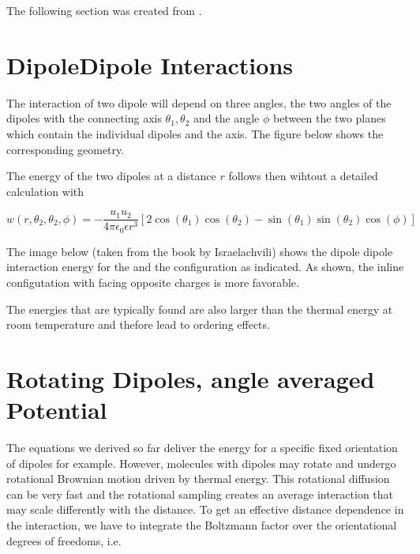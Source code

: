 \documentclass[letterpaper,10pt,english]{sphinxmanual}
\let\sphinxpxdimen\pdfpxdimen\else\newdimen\sphinxpxdimen
\begin{document}
\sphinxAtStartPar
The following section was created from .


\chapter{Dipole\sphinxhyphen{}Dipole Interactions}
\label{\detokenize{notebooks/L8/1_Forces_and_Interactions:Dipole-Dipole-Interactions}}\label{\detokenize{notebooks/L8/1_Forces_and_Interactions::doc}}
\sphinxAtStartPar
The interaction of two dipole will depend on three angles, the two angles of the dipoles with the connecting axis \(\theta_1, \theta_2\) and the angle \(\phi\) between the two planes which contain the individual dipoles and the axis. The figure below shows the corresponding geometry.

\noindent\sphinxincludegraphics[width=300\sphinxpxdimen,height=132\sphinxpxdimen]{{dipole_dipole}.png}

\sphinxAtStartPar
The energy of the two dipoles at a distance \(r\) follows then wihtout a detailed calculation with

\sphinxAtStartPar
\begin{equation}
w(r,\theta_2,\theta_2,\phi)=-\frac{u_1 u_2}{4\pi \epsilon_0 \epsilon r^3}\left [ 2\cos(\theta_1) \cos(\theta_2)-\sin(\theta_1)\sin(\theta_2)\cos(\phi)\right ]
\end{equation}

\sphinxAtStartPar
The image below (taken from the book by Israelachvili) shows the dipole dipole interaction energy for the  and the  configuration as indicated. As shown, the in\sphinxhyphen{}line configutation with facing opposite charges is more favorable.

\noindent\sphinxincludegraphics[width=300\sphinxpxdimen,height=225\sphinxpxdimen]{{dipole_energy}.png}

\sphinxAtStartPar
The energies that are typically found are also larger than the thermal energy at room temperature and thefore lead to ordering effects.


\chapter{Rotating Dipoles, angle averaged Potential}
\label{\detokenize{notebooks/L8/1_Forces_and_Interactions:Rotating-Dipoles,-angle-averaged-Potential}}
\sphinxAtStartPar
The equations we derived so far deliver the energy for a specific fixed orientation of dipoles for example. However, molecules with dipoles may rotate and undergo rotational Brownian motion driven by thermal energy. This rotational diffusion can be very fast and the rotational sampling creates an average interaction that may scale differently with the distance. To get an effective distance dependence in the interaction, we have to integrate the Boltzmann factor over the orientational degrees of
freedoms, i.e.
\end{document}
